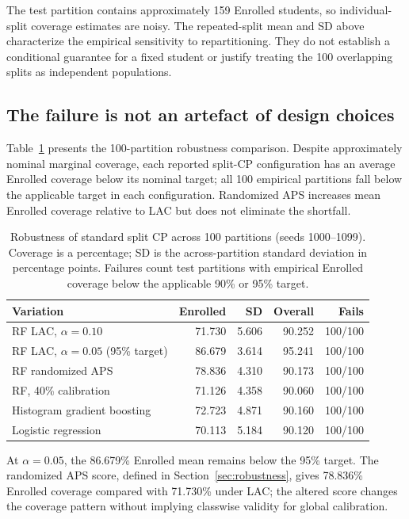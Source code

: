 The test partition contains approximately 159 \textsf{Enrolled} students, so
individual-split coverage estimates are noisy. The repeated-split mean and SD
above characterize the empirical sensitivity to repartitioning. They do not
establish a conditional guarantee for a fixed student or justify treating the
100 overlapping splits as independent populations.

\subsection{The failure is not an artefact of design choices}

Table~\ref{tab:robust} presents the 100-partition robustness comparison.
Despite approximately nominal marginal coverage, each reported split-CP
configuration has an average \textsf{Enrolled} coverage below its nominal target;
all 100 empirical partitions fall below the applicable target in each
configuration. Randomized APS increases mean \textsf{Enrolled} coverage
relative to LAC but does not eliminate the shortfall.

\begin{table}[htbp]
\centering\small
\caption{Robustness of standard split CP across 100 partitions (seeds
1000--1099). Coverage is a percentage; SD is the across-partition standard
deviation in percentage points. Failures count test partitions with empirical
\textsf{Enrolled} coverage below the applicable 90\% or 95\% target.}
\label{tab:robust}
\begin{tabular}{lrrrr}
\toprule
\textbf{Variation} & \textbf{Enrolled} & \textbf{SD} & \textbf{Overall} & \textbf{Fails}\\
\midrule
RF LAC, $\alpha=0.10$ & 71.730 & 5.606 & 90.252 & 100/100\\
RF LAC, $\alpha=0.05$ (95\% target) & 86.679 & 3.614 & 95.241 & 100/100\\
RF randomized APS & 78.836 & 4.310 & 90.173 & 100/100\\
RF, 40\% calibration & 71.126 & 4.358 & 90.060 & 100/100\\
Histogram gradient boosting & 72.723 & 4.871 & 90.160 & 100/100\\
Logistic regression & 70.113 & 5.184 & 90.120 & 100/100\\
\bottomrule
\end{tabular}
\end{table}

At $\alpha=0.05$, the 86.679\% Enrolled mean remains below the 95\%
target. The randomized APS score, defined in Section~\ref{sec:robustness},
gives 78.836\% Enrolled coverage compared with 71.730\% under LAC;
the altered score changes the coverage pattern without implying classwise
validity for global calibration.

